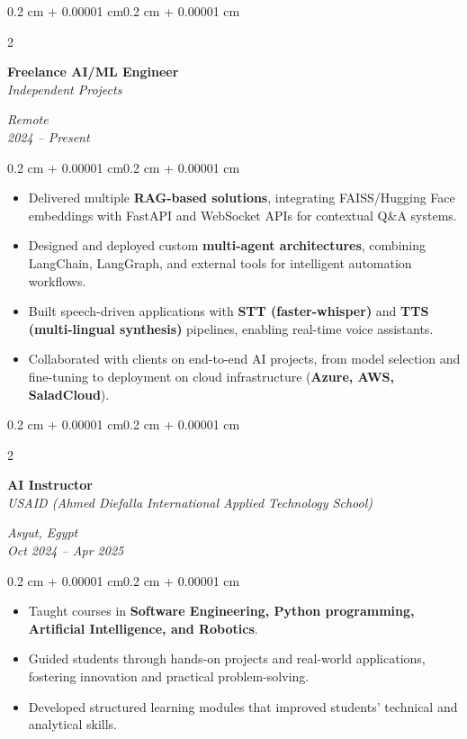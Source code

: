 \documentclass[10pt, letterpaper]{article}
\newenvironment{highlights}{
  \begin{itemize}[
    topsep=0.10 cm,
    parsep=0.10 cm,
    partopsep=0pt,
    itemsep=0pt,
    leftmargin=0.4 cm + 10pt
  ]}
  {\end{itemize}
}
\newenvironment{onecolentry}{
  \begin{adjustwidth}{0.2 cm + 0.00001 cm}{0.2 cm + 0.00001 cm}
}{
  \end{adjustwidth}
}
\newenvironment{twocolentry}[2][]{
  \onecolentry
  \def\secondColumn{#2}
  \setcolumnwidth{\fill, 4.5 cm}
  \begin{paracol}{2}
}{
  \switchcolumn \raggedleft \secondColumn
  \end{paracol}
  \endonecolentry
}
\begin{document}
\begin{twocolentry}{
  \textit{Remote} \\
  \textit{2024 -- Present}}
  \textbf{Freelance AI/ML Engineer} \\
  \textit{Independent Projects}
\end{twocolentry}
\vspace{0.10 cm}
\begin{onecolentry}
  \begin{highlights}
    \item Delivered multiple \textbf{RAG-based solutions}, integrating FAISS/Hugging Face embeddings with FastAPI and WebSocket APIs for contextual Q\&A systems.
    \item Designed and deployed custom \textbf{multi-agent architectures}, combining LangChain, LangGraph, and external tools for intelligent automation workflows.
    \item Built speech-driven applications with \textbf{STT (faster-whisper)} and \textbf{TTS (multi-lingual synthesis)} pipelines, enabling real-time voice assistants.
    \item Collaborated with clients on end-to-end AI projects, from model selection and fine-tuning to deployment on cloud infrastructure (\textbf{Azure, AWS, SaladCloud}).
  \end{highlights}
\end{onecolentry}

\begin{twocolentry}{
  \textit{Asyut, Egypt} \\
  \textit{Oct 2024 -- Apr 2025}}
  \textbf{AI Instructor} \\
  \textit{USAID (Ahmed Diefalla International Applied Technology School)}
\end{twocolentry}
\vspace{0.10 cm}
\begin{onecolentry}
  \begin{highlights}
    \item Taught courses in \textbf{Software Engineering, Python programming, Artificial Intelligence, and Robotics}.
    \item Guided students through hands-on projects and real-world applications, fostering innovation and practical problem-solving.
    \item Developed structured learning modules that improved students’ technical and analytical skills.
  \end{highlights}
\end{onecolentry}
\end{document}
